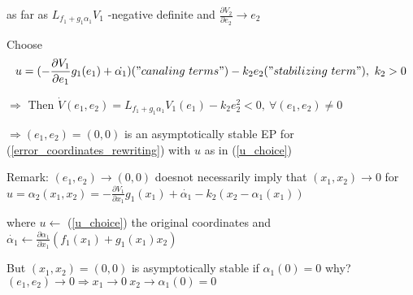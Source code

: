as far as $L_{f_1 + g_1\alpha_1}V_1$ -negative definite and $\frac{\partial V_2}{\partial e_2} \rightarrow e_2$

Choose 
\begin{equation}\label{u_choice}
u = (- \frac{\partial V_1}{\partial e_1}g_1(e_1) + \dot{\alpha_1})("canaling\ terms") - k_2e_2 ("stabilizing\ term"), \ k_2 > 0
\end{equation}

$\Rightarrow$ Then $\dot{V}(e_1, e_2) = L_{f_1 + g_1\alpha_1}V_1(e_1) - k_2e_2^2 < 0, \ \forall (e_1, e_2) \neq 0$

$\Rightarrow (e_1, e_2) = (0,0)$ is an asymptotically stable EP for (\ref{error_coordinates_rewriting}) with $u$ as in (\ref{u_choice}) 

Remark: $(e_1, e_2) \to (0,0)$ doesnot necessarily imply that $(x_1, x_2) \to 0$ for $u = \alpha_2(x_1, x_2) = - \frac{\partial V_1}{\partial x_1}g_1(x_1) + \dot{\alpha_1} - k_2(x_2 - \alpha_1(x_1))$

where $u \leftarrow$ (\ref{u_choice}) the original coordinates and $\dot{\alpha_1} \leftarrow \frac{\partial \alpha_1}{\partial x_1}(f_1(x_1) + g_1(x_1)x_2)$

But $(x_1, x_2) = (0,0)$ is asymptotically stable if $\alpha_1(0) = 0$ why? $(e_1,e_2) \to 0 \Rightarrow x_1 \to 0 \ x_2 \to \alpha_1(0) = 0$

